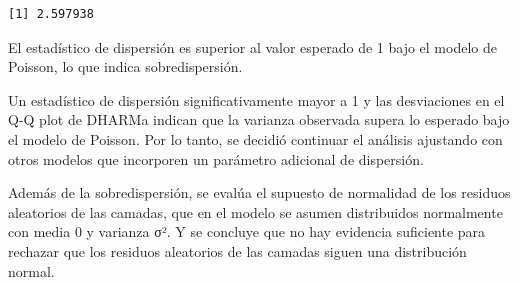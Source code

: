 \documentclass[
  letterpaper,
  DIV=11,
  numbers=noendperiod]{scrartcl}
\begin{document}
\begin{verbatim}
[1] 2.597938
\end{verbatim}

El estadístico de dispersión es superior al valor esperado de 1 bajo el
modelo de Poisson, lo que indica sobredispersión.

\begin{tcolorbox}[enhanced jigsaw, arc=.35mm, bottomrule=.15mm, bottomtitle=1mm, breakable, colback=white, colbacktitle=quarto-callout-important-color!10!white, colframe=quarto-callout-important-color-frame, coltitle=black, left=2mm, leftrule=.75mm, opacityback=0, opacitybacktitle=0.6, rightrule=.15mm, title=\textcolor{quarto-callout-important-color}{\faExclamation}\hspace{0.5em}{Sobredispersión confirmada}, titlerule=0mm, toprule=.15mm, toptitle=1mm]

Un estadístico de dispersión significativamente mayor a 1 y las
desviaciones en el Q-Q plot de DHARMa indican que la varianza observada
supera lo esperado bajo el modelo de Poisson. Por lo tanto, se decidió
continuar el análisis ajustando con otros modelos que incorporen un
parámetro adicional de dispersión.

\end{tcolorbox}

Además de la sobredispersión, se evalúa el supuesto de normalidad de los
residuos aleatorios de las camadas, que en el modelo se asumen
distribuidos normalmente con media 0 y varianza σ². Y se concluye que no
hay evidencia suficiente para rechazar que los residuos aleatorios de
las camadas siguen una distribución normal.
\end{document}
